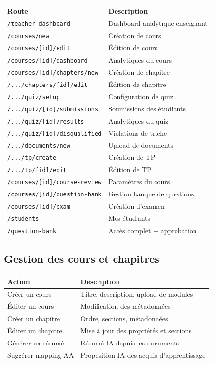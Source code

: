 \documentclass[12pt,a4paper]{article}
\begin{document}
\begin{longtable}{@{}p{7cm}p{7.5cm}@{}}
\toprule
\textbf{Route} & \textbf{Description} \\
\midrule
\endhead
\texttt{/teacher-dashboard} & Dashboard analytique enseignant \\
\texttt{/courses/new} & Création de cours \\
\texttt{/courses/[id]/edit} & Édition de cours \\
\texttt{/courses/[id]/dashboard} & Analytiques du cours \\
\texttt{/courses/[id]/chapters/new} & Création de chapitre \\
\texttt{/.../chapters/[id]/edit} & Édition de chapitre \\
\texttt{/.../quiz/setup} & Configuration de quiz \\
\texttt{/.../quiz/[id]/submissions} & Soumissions des étudiants \\
\texttt{/.../quiz/[id]/results} & Analytiques du quiz \\
\texttt{/.../quiz/[id]/disqualified} & Violations de triche \\
\texttt{/.../documents/new} & Upload de documents \\
\texttt{/.../tp/create} & Création de TP \\
\texttt{/.../tp/[id]/edit} & Édition de TP \\
\texttt{/courses/[id]/course-review} & Paramètres du cours \\
\texttt{/courses/[id]/question-bank} & Gestion banque de questions \\
\texttt{/courses/[id]/exam} & Création d'examen \\
\texttt{/students} & Mes étudiants \\
\texttt{/question-bank} & Accès complet + approbation \\
\bottomrule
\end{longtable}

\subsection{Gestion des cours et chapitres}

\begin{longtable}{@{}p{4.5cm}p{10cm}@{}}
\toprule
\textbf{Action} & \textbf{Description} \\
\midrule
\endhead
Créer un cours & Titre, description, upload de modules \\
Éditer un cours & Modification des métadonnées \\
Créer un chapitre & Ordre, sections, métadonnées \\
Éditer un chapitre & Mise à jour des propriétés et sections \\
Générer un résumé & Résumé IA depuis les documents \\
Suggérer mapping AA & Proposition IA des acquis d'apprentissage \\
\bottomrule
\end{longtable}
\end{document}
